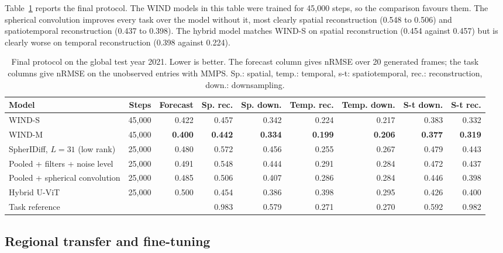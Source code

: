 \documentclass{article}
\begin{document}
Table~\ref{tab:global} reports the final protocol. The WIND models in this table were trained for 45,000 steps, so the comparison favours them. The spherical convolution improves every task over the model without it, most clearly spatial reconstruction (0.548 to 0.506) and spatiotemporal reconstruction (0.437 to 0.398). The hybrid model matches WIND-S on spatial reconstruction (0.454 against 0.457) but is clearly worse on temporal reconstruction (0.398 against 0.224).

\begin{table}[htbp]
\centering
\caption{Final protocol on the global test year 2021. Lower is better. The forecast column gives nRMSE over 20 generated frames; the task columns give nRMSE on the unobserved entries with MMPS. Sp.: spatial, temp.: temporal, s-t: spatiotemporal, rec.: reconstruction, down.: downsampling.}
\label{tab:global}
\footnotesize
\begin{adjustbox}{max width=\linewidth}
\begin{tabular}{lrrrrrrrr}
\toprule
Model & Steps & Forecast & Sp. rec. & Sp. down. & Temp. rec. & Temp. down. & S-t down. & S-t rec. \\
\midrule
WIND-S & 45,000 & 0.422 & 0.457 & 0.342 & 0.224 & 0.217 & 0.383 & 0.332 \\
WIND-M & 45,000 & \textbf{0.400} & \textbf{0.442} & \textbf{0.334} & \textbf{0.199} & \textbf{0.206} & \textbf{0.377} & \textbf{0.319} \\
\midrule
SpherIDiff, $L=31$ (low rank) & 25,000 & 0.480 & 0.572 & 0.456 & 0.255 & 0.267 & 0.479 & 0.443 \\
Pooled + filters + noise level & 25,000 & 0.491 & 0.548 & 0.444 & 0.291 & 0.284 & 0.472 & 0.437 \\
Pooled + spherical convolution & 25,000 & 0.485 & 0.506 & 0.407 & 0.286 & 0.284 & 0.446 & 0.398 \\
Hybrid U-ViT & 25,000 & 0.500 & 0.454 & 0.386 & 0.398 & 0.295 & 0.426 & 0.400 \\
\midrule
Task reference & & & 0.983 & 0.579 & 0.271 & 0.270 & 0.592 & 0.982 \\
\bottomrule
\end{tabular}
\end{adjustbox}
\end{table}

\subsection{Regional transfer and fine-tuning}
\end{document}
